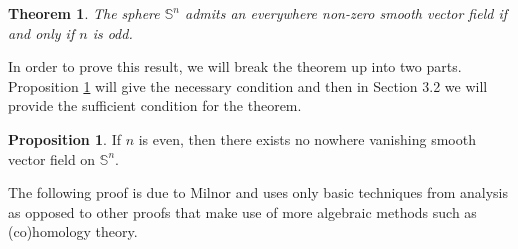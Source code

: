 \documentclass[12pt,a4paper]{article}
\numberwithin{equation}{section}
\newtheorem{theorem}{Theorem}[section]
\theoremstyle{definition}
\newtheorem{proposition}{Proposition}[section]
\theoremstyle{remark}
\begin{document}
\begin{theorem}
\label{thm:novan-iff-odd}
The sphere $\mathbb{S}^n$ admits an everywhere non-zero smooth vector field if and only if $n$ is odd.
\end{theorem}
In order to prove this result, we will break the theorem up into two parts. Proposition \ref{prop:even-noVF} will give the necessary condition and then in Section 3.2 we will provide the sufficient condition for the theorem.
\begin{proposition}
\label{prop:even-noVF}
If $n$ is even, then there exists no nowhere vanishing smooth vector field on $\mathbb{S}^n$.
\end{proposition}
The following proof is due to Milnor \cite{MR505523} and uses only basic techniques from analysis as opposed to other proofs that make use of more algebraic methods such as (co)homology theory.
\end{document}
